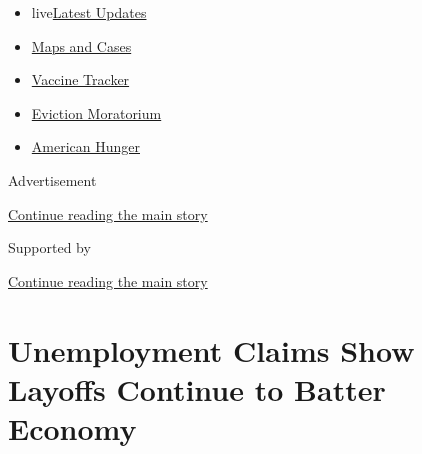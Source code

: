 \begin{itemize}
\tightlist
\item
  live\href{https://www.nytimes3xbfgragh.onion/2020/09/09/world/covid-19-coronavirus.html?name=styln-coronavirus-markets\&region=TOP_BANNER\&block=storyline_menu_recirc\&action=click\&pgtype=Article\&impression_id=95f37bc1-f2a1-11ea-9113-131123c250e5\&variant=undefined}{Latest
  Updates}
\item
  \href{https://www.nytimes3xbfgragh.onion/interactive/2020/us/coronavirus-us-cases.html?name=styln-coronavirus-markets\&region=TOP_BANNER\&block=storyline_menu_recirc\&action=click\&pgtype=Article\&impression_id=95f3a2d0-f2a1-11ea-9113-131123c250e5\&variant=undefined}{Maps
  and Cases}
\item
  \href{https://www.nytimes3xbfgragh.onion/interactive/2020/science/coronavirus-vaccine-tracker.html?name=styln-coronavirus-markets\&region=TOP_BANNER\&block=storyline_menu_recirc\&action=click\&pgtype=Article\&impression_id=95f3a2d1-f2a1-11ea-9113-131123c250e5\&variant=undefined}{Vaccine
  Tracker}
\item
  \href{https://www.nytimes3xbfgragh.onion/2020/09/02/your-money/eviction-moratorium-covid.html?name=styln-coronavirus-markets\&region=TOP_BANNER\&block=storyline_menu_recirc\&action=click\&pgtype=Article\&impression_id=95f3a2d2-f2a1-11ea-9113-131123c250e5\&variant=undefined}{Eviction
  Moratorium}
\item
  \href{https://www.nytimes3xbfgragh.onion/interactive/2020/09/02/magazine/food-insecurity-hunger-us.html?name=styln-coronavirus-markets\&region=TOP_BANNER\&block=storyline_menu_recirc\&action=click\&pgtype=Article\&impression_id=95f3a2d3-f2a1-11ea-9113-131123c250e5\&variant=undefined}{American
  Hunger}
\end{itemize}

Advertisement

\protect\hyperlink{after-top}{Continue reading the main story}

Supported by

\protect\hyperlink{after-sponsor}{Continue reading the main story}

\hypertarget{unemployment-claims-show-layoffs-continue-to-batter-economy}{%
\section{Unemployment Claims Show Layoffs Continue to Batter
Economy}\label{unemployment-claims-show-layoffs-continue-to-batter-economy}}

